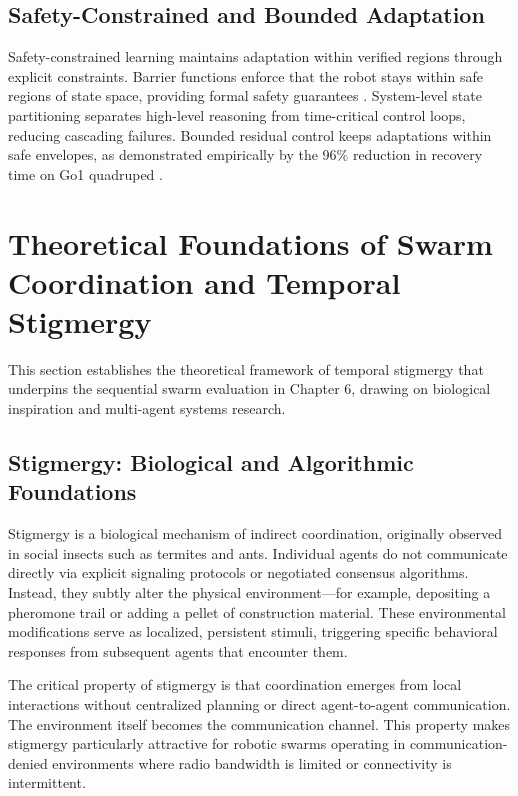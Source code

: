 \documentclass[12pt,a4paper,oneside]{report}
\begin{document}
\subsection{Safety-Constrained and Bounded Adaptation}
Safety-constrained learning maintains adaptation within verified regions through explicit constraints. Barrier functions enforce that the robot stays within safe regions of state space, providing formal safety guarantees \cite{brunke2021safe}. System-level state partitioning separates high-level reasoning from time-critical control loops, reducing cascading failures. Bounded residual control keeps adaptations within safe envelopes, as demonstrated empirically by the 96\% reduction in recovery time on Go1 quadruped \cite{jayasinghe2026residual}.

\section{Theoretical Foundations of Swarm Coordination and Temporal Stigmergy}
\label{sec:theoretical_foundations_swarm}

This section establishes the theoretical framework of temporal stigmergy that underpins the sequential swarm evaluation in Chapter 6, drawing on biological inspiration and multi-agent systems research.

\subsection{Stigmergy: Biological and Algorithmic Foundations}
Stigmergy is a biological mechanism of indirect coordination, originally observed in social insects such as termites and ants. Individual agents do not communicate directly via explicit signaling protocols or negotiated consensus algorithms. Instead, they subtly alter the physical environment---for example, depositing a pheromone trail or adding a pellet of construction material. These environmental modifications serve as localized, persistent stimuli, triggering specific behavioral responses from subsequent agents that encounter them.

The critical property of stigmergy is that coordination emerges from local interactions without centralized planning or direct agent-to-agent communication. The environment itself becomes the communication channel. This property makes stigmergy particularly attractive for robotic swarms operating in communication-denied environments where radio bandwidth is limited or connectivity is intermittent.
\end{document}
